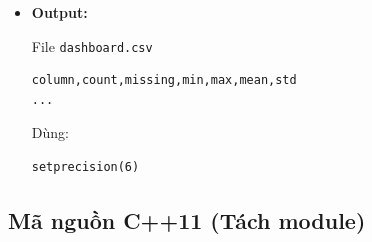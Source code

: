 \begin{itemize}
\begin{itemize}
    \end{itemize}

    \item \textbf{Output:}

    File \texttt{dashboard.csv}

\begin{lstlisting}
column,count,missing,min,max,mean,std
...
\end{lstlisting}

    Dùng:
\begin{lstlisting}
setprecision(6)
\end{lstlisting}

\end{itemize}

\subsection{Mã nguồn C++11 (Tách module)}

